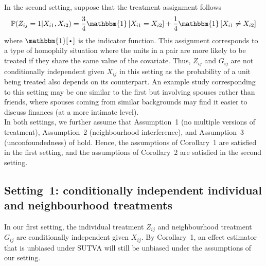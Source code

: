 \documentclass[10pt]{article}
\begin{document}
In the second setting, suppose that the treatment assignment follows
\[
\P(Z_{ij}=1|X_{i1},X_{i2}) = \frac{3}{4}\mathbbm{1}\left[X_{i1}=X_{i2}\right] + \frac{1}{4}\mathbbm{1}\left[X_{i1}\neq X_{i2}\right]
\]
where $\mathbbm{1}[\argdot]$ is the indicator function. This assignment corresponds to a type of homophily situation where the units in a pair are more likely to be treated if they share the same value of the covariate. Thus, $Z_{ij}$ and $G_{ij}$ are not conditionally independent given $X_{ij}$ in this setting as the probability of a unit being treated also depends on its counterpart. An example study corresponding to this setting may be one similar to the first but involving spouses rather than friends, where spouses coming from similar backgrounds may find it easier to discuss finances (at a more intimate level).
\\

In both settings, we further assume that Assumption~1 (no multiple versions of treatment), Assumption~2 (neighbourhood interference), and Assumption~3 (unconfoundedness) of \textcite{Forastiere:2021} hold. Hence, the assumptions of Corollary~1 are satisfied in the first setting, and the assumptions of Corollary~2 are satisfied in the second setting.

\subsection{Setting~1: conditionally independent individual and neighbourhood treatments}

In our first setting, the individual treatment $Z_{ij}$ and neighbourhood treatment $G_{ij}$ are conditionally independent given $X_{ij}$. By Corollary~1, an effect estimator that is unbiased under SUTVA will still be unbiased under the assumptions of our setting.
\\
\end{document}
